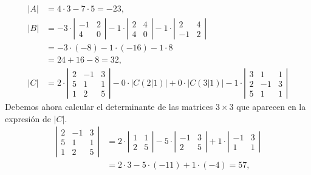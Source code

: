 \begin{enumerate}[topsep=6pt,itemsep=.4cm]
        \rta
        \begin{align*}
            \left| A \right| &= 4\cdot 3 - 7\cdot 5 = -23,\\
            \left| B \right| &= -3\cdot \left|\begin{matrix} -1&2\\ 4&0\end{matrix}\right| - 1\cdot \left|\begin{matrix} 2&4\\ 4&0\end{matrix}\right| - 1\cdot \left|\begin{matrix} 2&4\\ -1&2\end{matrix} \right|\\
            &= -3\cdot (-8) - 1\cdot (-16) - 1\cdot 8\\ 
            &= 24 + 16 -8 = 32,\\
            \left| C \right| &= 2 \cdot\left| \begin{matrix} 2&-1&3\\ 5&1&1\\ 1&2&5\end{matrix} \right| - 0 \cdot \left| C(2|1) \right| + 0 \cdot \left| C(3|1) \right| -1 \cdot\left|  \begin{matrix} 3&1&1\\ 2&-1&3 \\ 5&1&1\end{matrix} \right| \tag{*}
        \end{align*}
        Debemos ahora calcular el determinante de las matrices $3 \times 3$ que aparecen en la expresión de $|C|$. 
        \begin{align*}
            \left|\begin{matrix} 2&-1&3\\ 5&1&1\\ 1&2&5\end{matrix} \right| &= 2\cdot  \left|\begin{matrix} 1&1\\ 2&5\end{matrix} \right| - 5\cdot  \left|\begin{matrix} -1&3\\ 2&5\end{matrix} \right| + 1\cdot  \left|\begin{matrix} -1&3\\ 1&1\end{matrix} \right| \\
            &= 2\cdot 3  - 5\cdot (-11) + 1\cdot (-4) = 57,\\

\end{align*}
\end{enumerate}
